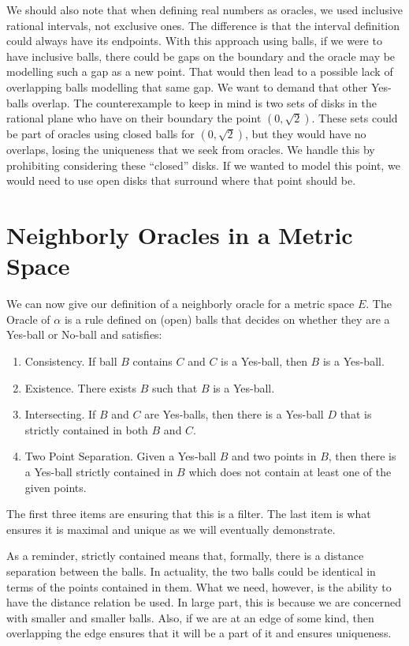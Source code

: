 \documentclass[12pt]{article}
\begin{document}
We should also note that when defining real numbers as oracles, we used inclusive rational intervals, not exclusive ones. The difference is that the interval definition could always have its endpoints. With this approach using balls, if we were to have inclusive balls, there could be gaps on the boundary and the oracle may be modelling such a gap as a new point. That would then lead to a possible lack of overlapping balls modelling that same gap. We want to demand that other Yes-balls overlap. The counterexample to keep in mind is two sets of disks in the rational plane who have on their boundary the point $(0, \sqrt{2})$. These sets could be part of oracles using closed balls for $(0, \sqrt{2})$, but they would have no overlaps, losing the uniqueness that we seek from oracles. We handle this by prohibiting considering these ``closed'' disks. If we wanted to model this point, we would need to use open disks that surround where that point should be. 


\section{Neighborly Oracles in a Metric Space}

We can now give our definition of a neighborly oracle for a metric space $E$. The Oracle of $\alpha$ is a rule defined on (open) balls that decides on whether they are a Yes-ball or No-ball and satisfies: 
\begin{enumerate}
    \item Consistency. If ball $B$ contains $C$ and $C$ is a Yes-ball, then $B$ is a Yes-ball.
    \item Existence. There exists $B$ such that $B$ is a Yes-ball.
    \item Intersecting. If $B$ and $C$ are Yes-balls, then there is a Yes-ball $D$ that is strictly contained in both $B$ and $C$. 
    \item Two Point Separation. Given a Yes-ball $B$ and two points in $B$, then there is a Yes-ball strictly contained in $B$ which does not contain at least one of the given points. 
\end{enumerate}

The first three items are ensuring that this is a filter. The last item is what ensures it is maximal and unique as we will eventually demonstrate. 

As a reminder, strictly contained means that, formally, there is a distance separation between the balls. In actuality, the two balls could be identical in terms of the points contained in them. What we need, however, is the ability to have the distance relation be used. In large part, this is because we are concerned with smaller and smaller balls. Also, if we are at an edge of some kind, then overlapping the edge ensures that it will be a part of it and ensures uniqueness. 
\end{document}
